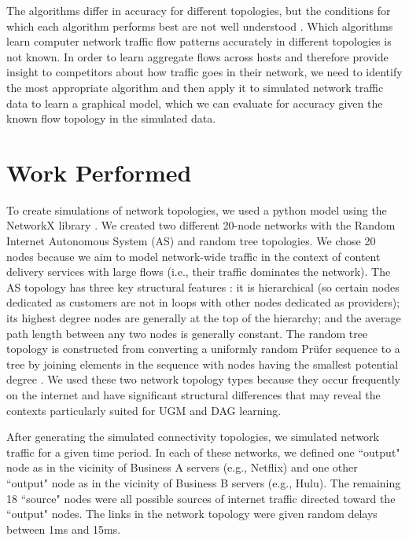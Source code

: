 \documentclass[conference]{IEEEtran}
\begin{document}
The algorithms differ in accuracy for different topologies, but the conditions for which each algorithm performs best are not well understood \cite{b13}. Which algorithms learn computer network traffic flow patterns accurately in different topologies is not known. In order to learn aggregate flows across hosts and therefore provide insight to competitors about how traffic goes in their network, we need to identify the most appropriate algorithm and then apply it to simulated network traffic data to learn a graphical model, which we can evaluate for accuracy given the known flow topology in the simulated data.


\section{Work Performed}

To create simulations of network topologies, we used a python model using the NetworkX library \cite{b14}. We created two different 20-node networks with the Random Internet Autonomous System (AS) and random tree topologies. We chose 20 nodes because we aim to model network-wide traffic in the context of content delivery services with large flows (i.e., their traffic dominates the network). The AS topology has three key structural features \cite{b15}: it is hierarchical (so certain nodes dedicated as customers are not in loops with other nodes dedicated as providers); its highest degree nodes are generally at the top of the hierarchy; and the average path length between any two nodes is generally constant. The random tree topology is constructed from converting a uniformly random Prüfer sequence to a tree by joining elements in the sequence with nodes having the smallest potential degree \cite{b16}. We used these two network topology types because they occur frequently on the internet and have significant structural differences that may reveal the contexts particularly suited for UGM and DAG learning. 

After generating the simulated connectivity topologies, we simulated network traffic for a given time period. In each of these networks, we defined one ``output" node as in the vicinity of Business A servers (e.g., Netflix) and one other ``output" node as in the vicinity of Business B servers (e.g., Hulu). The remaining 18 ``source" nodes were all possible sources of internet traffic directed toward the ``output" nodes. The links in the network topology were given random delays between 1ms and 15ms.
\end{document}
